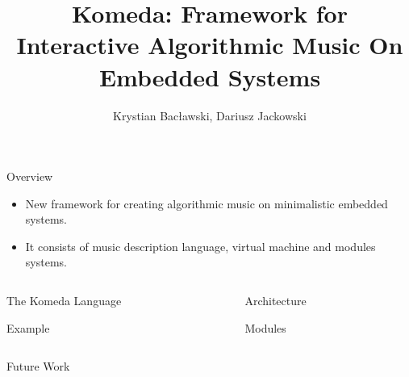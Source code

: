 \documentclass[final,hyperref={pdfpagelabels=false}]{beamer}
\title[Komeda]{Komeda: Framework for Interactive Algorithmic Music On Embedded
  Systems}
\author[Baclawski & Jackowski]{Krystian Bac\l awski, Dariusz Jackowski}
\institute[University of Wroclaw]{University of Wroc\l aw\\ Institute of the Computer Science, Wroc\l aw, Poland}
\begin{document}
  \begin{frame}{} 

    \begin{block}{\large Overview}
	\begin{itemize}
	\item New framework for creating algorithmic music on minimalistic embedded systems.
	\item It consists of music description language, virtual machine and modules systems. 
	\end{itemize}
    \end{block}
    \begin{columns}[t]
      \begin{column}{.49\linewidth}
        \begin{block}{The Komeda Language}
         
		\end{block}
	        \begin{block}{Example}
	         
        \end{block}
        
      \end{column}
      \begin{column}{.49\linewidth}
        \begin{block}{Architecture}
         
        \end{block}
        \begin{block}{Modules}

        \end{block}

      \end{column}
    \end{columns}

 

    \begin{block}{\large Future Work}


    \end{block}

  \end{frame}
\end{document}

